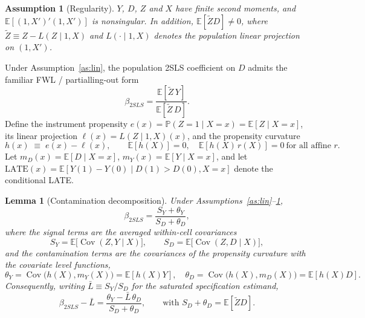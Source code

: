 \documentclass[preprint,11pt,authoryear]{elsarticle}
\newtheorem{assumption}{Assumption}
\newtheorem{lemma}{Lemma}
\theoremstyle{definition}
\newcommand{\E}{\mathbb{E}}
\newcommand{\Prob}{\mathbb{P}}
\newcommand{\Cov}{\operatorname{Cov}}
\newcommand{\Ztil}{\tilde{Z}}
\newcommand{\late}{\mathrm{LATE}}
\begin{document}
\begin{assumption}[Regularity]\label{as:reg}
$Y$, $D$, $Z$ and $X$ have finite second moments, and $\E[(1,X')'(1,X')]$ is
nonsingular. In addition, $\E[\Ztil D]\neq 0$, where $\Ztil\equiv Z-L(Z\mid 1,X)$ and
$L(\cdot\mid 1,X)$ denotes the population linear projection on $(1,X')$.
\end{assumption}

Under Assumption~\ref{as:lin}, the population 2SLS coefficient on $D$ admits the
familiar FWL / partialling-out form
\begin{equation}\label{eq:fwl}
\beta_{2SLS}=\frac{\E[\Ztil\,Y]}{\E[\Ztil\,D]} .
\end{equation}
Define the instrument propensity $e(x)=\Prob(Z=1\mid X=x)=\E[Z\mid X=x]$, its
linear projection $\ell(x)=L(Z\mid 1,X)(x)$, and the propensity curvature
\begin{equation}\label{eq:h}
h(x)\;\equiv\; e(x)-\ell(x),\qquad \E[h(X)]=0,\quad \E[h(X)\,r(X)]=0
\ \text{for all affine } r.
\end{equation}
Let $m_D(x)=\E[D\mid X=x]$, $m_Y(x)=\E[Y\mid X=x]$, and let
$\late(x)=\E[Y(1)-Y(0)\mid D(1)>D(0),X=x]$ denote the conditional LATE.

\begin{lemma}[Contamination decomposition]\label{lem:decomp}
Under Assumptions~\ref{as:lin}--\ref{as:reg},
\begin{equation}\label{eq:decomp}
\beta_{2SLS}=\frac{S_Y+\theta_Y}{S_D+\theta_D},
\end{equation}
where the \emph{signal} terms are the averaged within-cell covariances
\[
S_Y=\E\!\big[\Cov(Z,Y\mid X)\big],\qquad
S_D=\E\!\big[\Cov(Z,D\mid X)\big],
\]
and the \emph{contamination} terms are the covariances of the propensity curvature
with the covariate level functions,
\[
\theta_Y=\Cov\!\big(h(X),m_Y(X)\big)=\E[h(X)Y],\quad
\theta_D=\Cov\!\big(h(X),m_D(X)\big)=\E[h(X)D].
\]
Consequently, writing $\bar L\equiv S_Y/S_D$ for the saturated specification estimand,
\begin{equation}\label{eq:bias}
\beta_{2SLS}-\bar L=\frac{\theta_Y-\bar L\,\theta_D}{S_D+\theta_D},
\qquad\text{with } S_D+\theta_D=\E[\Ztil D].
\end{equation}
\end{lemma}
\end{document}
